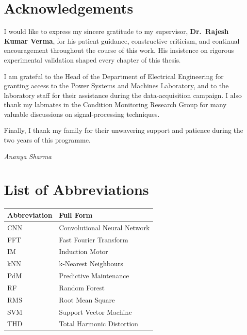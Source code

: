 \documentclass[12pt,a4paper]{report}
\begin{document}
\chapter*{Acknowledgements}

I would like to express my sincere gratitude to my supervisor, \textbf{Dr.\ Rajesh Kumar
Verma}, for his patient guidance, constructive criticism, and continual encouragement throughout
the course of this work. His insistence on rigorous experimental validation shaped every chapter
of this thesis.

I am grateful to the Head of the Department of Electrical Engineering for granting access to the
Power Systems and Machines Laboratory, and to the laboratory staff for their assistance during
the data-acquisition campaign. I also thank my labmates in the Condition Monitoring Research
Group for many valuable discussions on signal-processing techniques.

Finally, I thank my family for their unwavering support and patience during the two years of
this programme.

\begin{flushright}
\textit{Ananya Sharma}
\end{flushright}

\tableofcontents
\listoffigures
\listoftables

\chapter*{List of Abbreviations}
\begin{tabularx}{\textwidth}{@{}l X@{}}
\toprule
\textbf{Abbreviation} & \textbf{Full Form} \\
\midrule
CNN & Convolutional Neural Network \\
FFT & Fast Fourier Transform \\
IM  & Induction Motor \\
kNN & k-Nearest Neighbours \\
PdM & Predictive Maintenance \\
RF  & Random Forest \\
RMS & Root Mean Square \\
SVM & Support Vector Machine \\
THD & Total Harmonic Distortion \\
\bottomrule
\end{tabularx}
\end{document}
